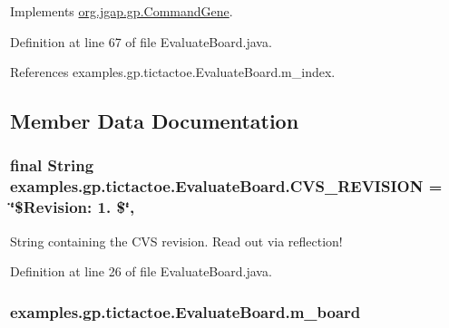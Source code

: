 Implements \hyperlink{classorg_1_1jgap_1_1gp_1_1_command_gene_a236141d99059da808afe7a9217e411c7}{org.\-jgap.\-gp.\-Command\-Gene}.



Definition at line 67 of file Evaluate\-Board.\-java.



References examples.\-gp.\-tictactoe.\-Evaluate\-Board.\-m\-\_\-index.



\subsection{Member Data Documentation}
\hypertarget{classexamples_1_1gp_1_1tictactoe_1_1_evaluate_board_a11153991bc1f120315629c7a1b2e4614}{
\subsubsection[{C\-V\-S\-\_\-\-R\-E\-V\-I\-S\-I\-O\-N}]{\setlength{\rightskip}{0pt plus 5cm}final String examples.\-gp.\-tictactoe.\-Evaluate\-Board.\-C\-V\-S\-\_\-\-R\-E\-V\-I\-S\-I\-O\-N = \char`\"{}\$Revision\-: 1. \$\char`\"{}\hspace{0.3cm}{\ttfamily [static]}, {\ttfamily [private]}}}\label{classexamples_1_1gp_1_1tictactoe_1_1_evaluate_board_a11153991bc1f120315629c7a1b2e4614}
String containing the C\-V\-S revision. Read out via reflection! 

Definition at line 26 of file Evaluate\-Board.\-java.

\hypertarget{classexamples_1_1gp_1_1tictactoe_1_1_evaluate_board_a310419ed2fa9f1234affdf3caf018223}{
\subsubsection[{m\-\_\-board}]{ examples.\-gp.\-tictactoe.\-Evaluate\-Board.\-m\-\_\-board\hspace{0.3cm}{\ttfamily [private]}}}\label{classexamples_1_1gp_1_1tictactoe_1_1_evaluate_board_a310419ed2fa9f1234affdf3caf018223}


